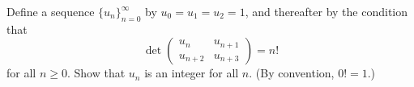 Define a sequence $\{ u_n \}_{n=0}^\infty$
by  $u_0 = u_1 = u_2 = 1$, and thereafter by
the
condition that
\[
\det\begin{pmatrix}
u_n &   u_{n+1}\\
u_{n+2} & u_{n+3}
\end{pmatrix}
= n!
\]
for all $n \ge 0$. Show that $u_n$ is an integer for all $n$.
(By convention, $0! = 1$.)
